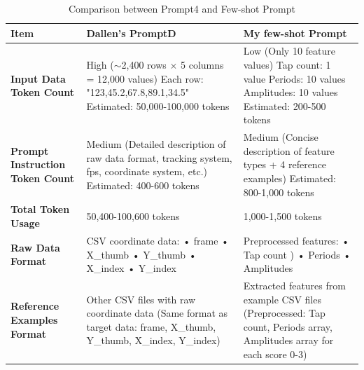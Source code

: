 \documentclass{article}
\begin{document}
\begin{table}[h]
\centering
\small
\begin{tabular}{p{3.5cm}p{5.5cm}p{5.5cm}}
\toprule
\textbf{Item} & \textbf{Dallen's PromptD} & \textbf{My few-shot Prompt} \\
\midrule
\textbf{Input Data Token Count} & 
High\newline
($\sim$2,400 rows $\times$ 5 columns = 12,000 values)\newline
Each row: "123,45.2,67.8,89.1,34.5"\newline
Estimated: 50,000-100,000 tokens & 
Low\newline
(Only 10 feature values)\newline
Tap count: 1 value\newline
Periods: 10 values\newline
Amplitudes: 10 values\newline
Estimated: 200-500 tokens \\
\midrule
\textbf{Prompt Instruction Token Count} & 
Medium\newline
(Detailed description of raw data format, tracking system, fps, coordinate system, etc.)\newline
Estimated: 400-600 tokens & 
Medium\newline
(Concise description of feature types + 4 reference examples)\newline
Estimated: 800-1,000 tokens \\
\midrule
\textbf{Total Token Usage} & 
50,400-100,600 tokens & 
1,000-1,500 tokens \\
\midrule
\textbf{Raw Data Format} & 
CSV coordinate data:\newline
• frame \newline
• X\_thumb \newline
• Y\_thumb \newline
• X\_index \newline
• Y\_index  & 
Preprocessed features:\newline
• Tap count )\newline
• Periods \newline
• Amplitudes  \\
\midrule
\textbf{Reference Examples Format} & 
Other CSV files with raw coordinate data\newline
(Same format as target data: frame, X\_thumb, Y\_thumb, X\_index, Y\_index) & 
Extracted features from example CSV files\newline
(Preprocessed: Tap count, Periods array, Amplitudes array for each score 0-3) \\
\bottomrule
\end{tabular}
\caption{Comparison between Prompt4 and Few-shot Prompt}
\label{tab:comparison}
\end{table}
\end{document}
